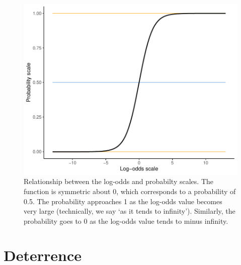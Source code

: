\documentclass[11pt]{article}
\begin{document}
\begin{figure}%
\centering
\includegraphics[scale=0.8]{logit_plot.pdf}
\caption{Relationship between the log-odds and probabilty scales. The function is symmetric about 0, which corresponds to a probability of 0.5. The probability approaches 1 as the log-odds value becomes very large (technically, we say `as it tends to infinity'). Similarly, the probability goes to 0 as the log-odds value tends to minus infinity.}
\end{figure}


\section{Deterrence}
\end{document}
